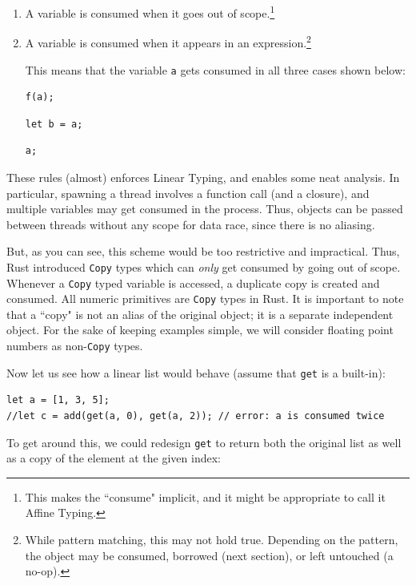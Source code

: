 \documentclass[11pt]{report}
\begin{document}
\begin{enumerate}
\item A variable is consumed when it goes out of scope.\footnote{This makes the ``consume" implicit, and it might be appropriate to call it Affine Typing.}
\item A variable is consumed when it appears in an expression.\footnote{While pattern matching, this may not hold true. Depending on the pattern, the object may be consumed, borrowed (next section), or left untouched (a no-op).}

This means that the variable \texttt{a} gets consumed in all three cases shown below:

\begin{lstlisting}
f(a);
\end{lstlisting}

\begin{lstlisting}
let b = a;
\end{lstlisting}

\begin{lstlisting}
a;
\end{lstlisting}
\end{enumerate}

These rules (almost) enforces Linear Typing, and enables some neat analysis. In particular, spawning a thread involves a function call (and a closure), and multiple variables may get consumed in the process. Thus, objects can be passed between threads without any scope for data race, since there is no aliasing.

But, as you can see, this scheme would be too restrictive and impractical. Thus, Rust introduced \texttt{Copy} types which can \textit{only} get consumed by going out of scope. Whenever a \texttt{Copy} typed variable is accessed, a duplicate copy is created and consumed. All numeric primitives are \texttt{Copy} types in Rust. It is important to note that a ``copy" is not an alias of the original object; it is a separate independent object. For the sake of keeping examples simple, we will consider floating point numbers as non-\texttt{Copy} types.

Now let us see how a linear list would behave (assume that \texttt{get} is a built-in):

\begin{lstlisting}
let a = [1, 3, 5];
//let c = add(get(a, 0), get(a, 2)); // error: a is consumed twice
\end{lstlisting}

To get around this, we could redesign \texttt{get} to return both the original list as well as a copy of the element at the given index:
\end{document}
